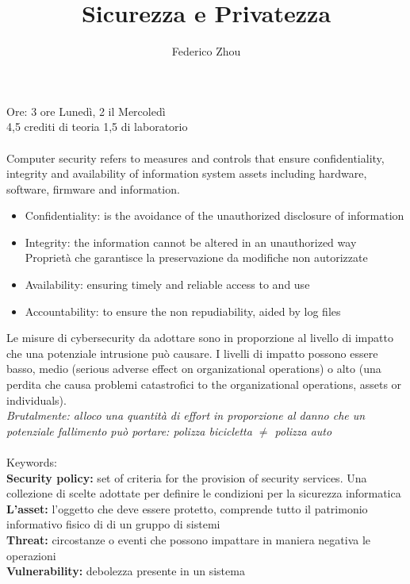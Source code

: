 \documentclass[11pt, oneside]{article}   	%
\title{Sicurezza e Privatezza}
\author{Federico Zhou}
\begin{document}
\maketitle
Ore: 3 ore Lunedì, 2 il Mercoledì\\
4,5 crediti di teoria 1,5 di laboratorio\\\\
Computer security refers to measures and controls that ensure confidentiality, integrity and availability of information system assets including hardware, software, firmware and information.\\
\begin{itemize}
\item Confidentiality: is the avoidance of the unauthorized disclosure of information
\item Integrity: the information cannot be altered in an unauthorized way\\
Proprietà che garantisce la preservazione da modifiche non autorizzate
\item Availability: ensuring timely and reliable access to and use
\item Accountability: to ensure the non repudiability, aided by log files
\end{itemize}
Le misure di cybersecurity da adottare sono in proporzione al livello di impatto che una potenziale intrusione può causare. I livelli di impatto possono essere basso, medio (serious adverse effect on organizational operations) o alto (una perdita che causa problemi catastrofici to the organizational operations, assets or individuals).\\
\emph{Brutalmente: alloco una quantità di effort in proporzione al danno che un potenziale fallimento può portare: polizza bicicletta $\neq$ polizza auto}\\\\
Keywords:\\
\textbf{Security policy:} set of criteria for the provision of security services. Una collezione di scelte adottate per definire le condizioni per la sicurezza informatica\\
\textbf{L'asset:} l'oggetto che deve essere protetto, comprende tutto il patrimonio informativo fisico di di un gruppo di sistemi\\
\textbf{Threat:} circostanze o eventi che possono impattare in maniera negativa le operazioni\\
\textbf{Vulnerability:} debolezza presente in un sistema\\\\
\end{document}
